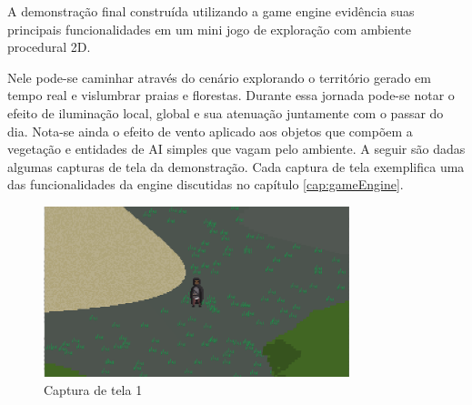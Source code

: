 \documentclass[12pt, 
openright, 
oneside, 
a4paper,    
brazil]{facom-ufu-abntex2}
\begin{document}
A demonstração final construída utilizando a game engine evidência suas principais funcionalidades em um mini jogo de exploração com ambiente procedural 2D.

Nele pode-se caminhar através do cenário explorando o território gerado em tempo real e vislumbrar praias e florestas. Durante essa jornada pode-se notar o efeito de iluminação local, global e sua atenuação juntamente com o passar do dia.  Nota-se ainda o efeito de vento aplicado aos objetos que compõem a vegetação e entidades de AI simples que vagam pelo ambiente. A seguir são dadas algumas capturas de tela da demonstração. Cada captura de tela exemplifica uma das funcionalidades da engine discutidas no capítulo \ref{cap:gameEngine}.


\begin{figure}[H]
	\centering
	\includegraphics[width=24em]{imagens/ss1.png}
	\caption{Captura de tela 1}
\end{figure}
\end{document}
